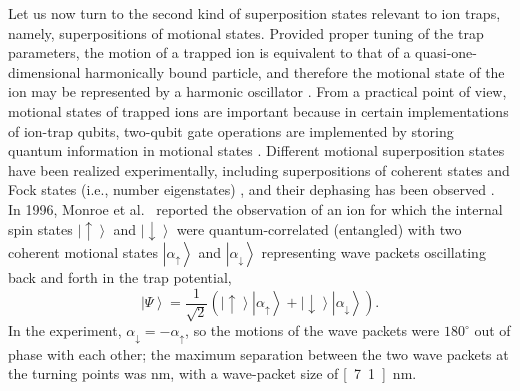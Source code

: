 \documentclass[3p,sort&compress,12pt]{elsarticle}
\newcommand{\ket}[1]{\left\vert{#1}\right\rangle}
\begin{document}
Let us now turn to the second kind of superposition states relevant to ion traps, namely, superpositions of motional states. Provided proper tuning of the trap parameters, the motion of a trapped ion is equivalent to that of a quasi-one-dimensional harmonically bound particle, and therefore the motional state of the ion may be represented by a harmonic oscillator \cite{Leibfried:2003:om,Wineland:2013:pp}. From a practical point of view, motional states of trapped ions are important because in certain implementations of ion-trap qubits, two-qubit gate operations are implemented by storing quantum information in motional states \cite{Cirac:1995:tt}. Different motional superposition states have been realized experimentally, including superpositions of coherent states \cite{Monroe:1996:tv,Myatt:2000:yy,Turchette:2000:aa,Wineland:2013:pp} and Fock states (i.e., number eigenstates) \cite{Myatt:2000:yy,Turchette:2000:aa}, and their dephasing has been observed \cite{Myatt:2000:yy,Turchette:2000:aa,SchmidtKaler:2003:pp}. In 1996, Monroe et al.\ \cite{Monroe:1996:tv} reported the observation of an ion for which the internal spin states $\ket{\uparrow}$ and $\ket{\downarrow}$ were quantum-correlated (entangled) with two coherent motional states $\ket{\alpha_\uparrow}$ and $\ket{\alpha_\downarrow}$ representing wave packets oscillating back and forth in the trap potential, 
%
\begin{equation}\label{eq:lidvg2}
\ket{\Psi} = \frac{1}{\sqrt{2}} \left( \ket{\uparrow}\ket{\alpha_\uparrow} + \ket{\downarrow} \ket{\alpha_\downarrow} \right).
\end{equation}
%
In the experiment, $\alpha_\downarrow=-\alpha_\uparrow$, so the motions of the wave packets were $180^\circ$ out of phase with each other; the maximum separation between the two wave packets at the turning points was \unit[83]{nm}, with a wave-packet size of \unit[7.1]{nm}. 
\end{document}
